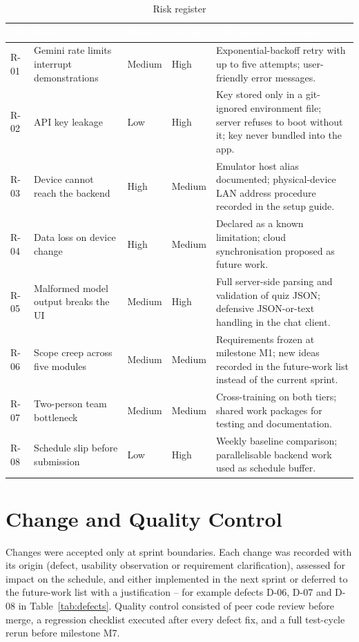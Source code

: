 \documentclass[12pt,a4paper,oneside]{report}
\begin{document}
\begin{table}[H]
\centering
\caption{Risk register}
\label{tab:risk}
\small
\begin{tabularx}{\textwidth}{@{}p{1.0cm}p{4.3cm}p{1.5cm}p{1.5cm}X@{}}
\toprule
\rowcolor{tblhead} \textcolor{white}{\textbf{ID}} &
\textcolor{white}{\textbf{Risk}} &
\textcolor{white}{\textbf{Prob.}} &
\textcolor{white}{\textbf{Impact}} &
\textcolor{white}{\textbf{Mitigation / response}} \\
\midrule
R-01 & Gemini rate limits interrupt demonstrations & Medium & High & Exponential-backoff retry with up to five attempts; user-friendly error messages. \\
R-02 & API key leakage & Low & High & Key stored only in a git-ignored environment file; server refuses to boot without it; key never bundled into the app. \\
R-03 & Device cannot reach the backend & High & Medium & Emulator host alias documented; physical-device LAN address procedure recorded in the setup guide. \\
R-04 & Data loss on device change & High & Medium & Declared as a known limitation; cloud synchronisation proposed as future work. \\
R-05 & Malformed model output breaks the UI & Medium & High & Full server-side parsing and validation of quiz JSON; defensive JSON-or-text handling in the chat client. \\
R-06 & Scope creep across five modules & Medium & Medium & Requirements frozen at milestone M1; new ideas recorded in the future-work list instead of the current sprint. \\
R-07 & Two-person team bottleneck & Medium & Medium & Cross-training on both tiers; shared work packages for testing and documentation. \\
R-08 & Schedule slip before submission & Low & High & Weekly baseline comparison; parallelisable backend work used as schedule buffer. \\
\bottomrule
\end{tabularx}
\end{table}

\section{Change and Quality Control}

Changes were accepted only at sprint boundaries. Each change was recorded with its
origin (defect, usability observation or requirement clarification), assessed for
impact on the schedule, and either implemented in the next sprint or deferred to the
future-work list with a justification -- for example defects D-06, D-07 and D-08 in
Table~\ref{tab:defects}. Quality control consisted of peer code review before merge,
a regression checklist executed after every defect fix, and a full test-cycle rerun
before milestone M7.
\end{document}
